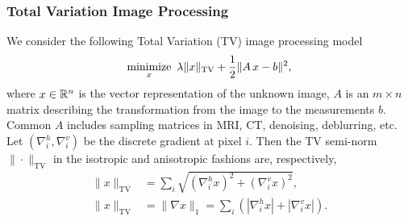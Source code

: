 \subsubsection{Total Variation Image Processing}
We consider the following Total Variation (TV) image processing model
\begin{equation}\label{eqn:tvl2}
\Min_{x}~\lambda \|x\|_{\text{TV}} + \frac{1}{2} \|A\,x - b\|^2,
\end{equation}
where $x\in \mathbb{R}^n$ is the vector representation of the unknown image, $A$ is an $m \times n$ matrix describing the transformation from the image to the measurements $b$. Common $A$ includes sampling matrices in MRI, CT, denoising, deblurring, etc.  Let $(\nabla_i^h,\nabla_i^v)$ be the discrete gradient at pixel $i$. Then the TV semi-norm $\|\cdot\|_{\text{TV}}$ in the isotropic and anisotropic fashions are, respectively,
\begin{subequations}\label{eqn:tv_def}
\begin{align}
\|x\|_{\text{TV}} &= {\sum_{i} \sqrt{(\nabla_i^h x)^2 + (\nabla_i^v x)^2},}\\
  \| x\|_{\text{TV}} &= \| \nabla x\|_1 = \sum_{i} \left(|\nabla_i^h x| + |\nabla_i^v x|\right).
	\end{align}
\end{subequations}

%
%
%

